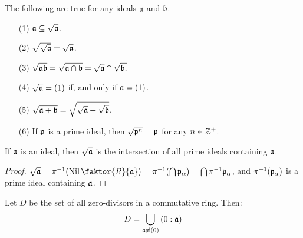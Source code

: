 \begin{proposition}\label{proposition_5.5.14}
  The following are true for any ideals $\af$ and  $\bf$.
  \begin{enumerate}
    \item[(1)] $\af \subseteq \sqrt{\af}$.

    \item[(2)] $\sqrt{\sqrt{\af}}=\sqrt{\af}$.

    \item[(3)] $\sqrt{\af\bf}=\sqrt{\af \cap \bf}=\sqrt{\af} \cap \sqrt{\bf.}$

    \item[(4)] $\sqrt{\af}=(1)$ if, and only if $\af=(1)$.

    \item[(5)] $\sqrt{\af+\bf}=\sqrt{\sqrt{\af}+\sqrt{\bf}}$.

    \item[(6)] If $\pf$ is a prime ideal, then $\sqrt{\pf^n}=\pf$ for any $n \in
      \Z^+$.
  \end{enumerate}
\end{proposition}

\begin{proposition}\label{proposition_5.5.15}
  If $\af$ is an ideal, then $\sqrt{\af}$ is the intersection of all prime
  ideals containing $\af$.
\end{proposition}
\begin{proof}
  $\sqrt{\af}=\inv{\pi}(\Nil{\faktor{R}{\af}})=\inv{\pi}(\bigcap{\pf_\a})=
  \bigcap{\inv{\pi}\pf_\a}$, and  $\inv{\pi}(\pf_\a)$ is a prime ideal
  containing $\af$.
\end{proof}

\begin{proposition}\label{proposition_5.5.16}
  Let $D$ be the set of all zero-divisors in a commutative ring. Then:
  \begin{equation}
    D=\bigcup_{\af \neq (0)}{(0:\af)}
  \end{equation}
\end{proposition}
